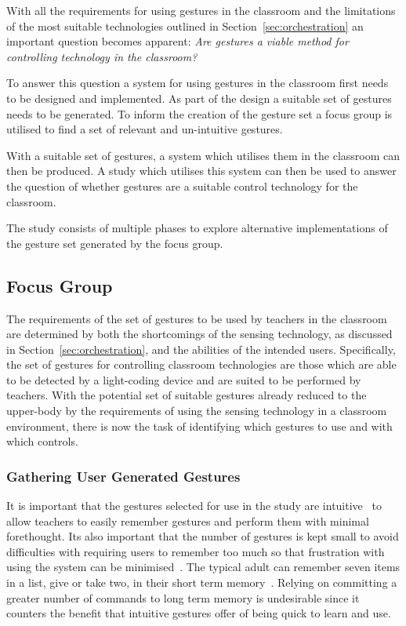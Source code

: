 \documentclass[link]{IWCOMP}
\begin{document}
With all the requirements for using gestures in the classroom and the limitations of the most suitable technologies outlined in Section~\ref{sec:orchestration} an important question becomes apparent:
\emph{Are gestures a viable method for controlling technology in the classroom?}

To answer this question a system for using gestures in the classroom first needs to be designed and implemented.
As part of the design a suitable set of gestures needs to be generated.
To inform the creation of the gesture set a focus group is utilised to find a set of relevant and un-intuitive gestures.

With a suitable set of gestures, a system which utilises them in the classroom can then be produced.
A study which utilises this system can then be used to answer the question of whether gestures are a suitable control technology for the classroom.

The study consists of multiple phases to explore alternative implementations of the gesture set generated by the focus group.


\subsection{Focus Group}
\label{subsec:focusGroup}

The requirements of the set of gestures to be used by teachers in the classroom are determined by both the shortcomings of the sensing technology, as discussed in Section~\ref{sec:orchestration}, and the abilities of the intended users.
Specifically, the set of gestures for controlling classroom technologies are those which are able to be detected by a light-coding device and are suited to be performed by teachers.
With the potential set of suitable gestures already reduced to the upper-body by the requirements of using the sensing technology in a classroom environment, there is now the task of identifying which gestures to use and with which controls.


\subsubsection{Gathering User Generated Gestures} 
\label{subsec:gatheringGestures}

It is important that the gestures selected for use in the study are intuitive~\cite{Cohen,Wachs2011} to allow teachers to easily remember gestures and perform them with minimal forethought.
Its also important that the number of gestures is kept small to avoid difficulties with requiring users to remember too much so that frustration with using the system can be minimised~\cite{Mendoza2005}.
The typical adult can remember seven items in a list, give or take two, in their short term memory~\cite{mil56}.
Relying on committing a greater number of commands to long term memory is undesirable since it counters the benefit that intuitive gestures offer of being quick to learn and use.
\end{document}
